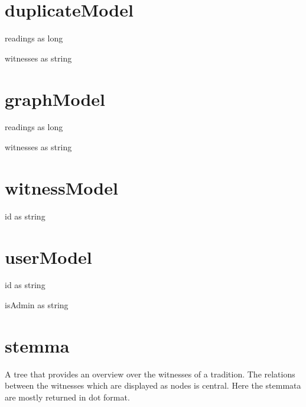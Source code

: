 \section{duplicateModel}
\begin{property}
readings as long
\end{property}
\begin{property}
witnesses as string
\end{property}
\section{graphModel}
\begin{property}
readings as long
\end{property}
\begin{property}
witnesses as string
\end{property}
\section{witnessModel}
\begin{property}
id as string
\end{property}
\section{userModel}
\begin{property}
id as string
\end{property}
\begin{property}
isAdmin as string
\end{property}
\section{stemma}
A tree that provides an overview over the witnesses of a tradition. The relations between the witnesses which are displayed as nodes is central. Here the stemmata are mostly returned in dot format.
